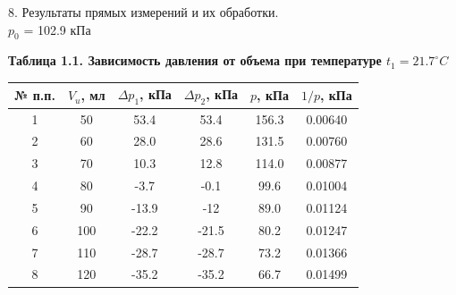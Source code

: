 \documentclass[12pt]{article}
\begin{document}
\begin{flushleft}
    8. Результаты прямых измерений и их обработки. \\
    $p_0$ = 102.9 кПа \\
    \newpage

    \begin{center}
        \textbf{Таблица 1.1. Зависимость давления от объема при температуре $ t_1 = 21.7^\circ C $} \\
    \end{center}
    \begin{table}[h]
        \centering
        \begin{tabular}{|c|c|c|c|c|c|}
            \hline
            № п.п. & $ V_u $, мл & $ \Delta p_1 $, кПа & $ \Delta p_2 $, кПа & $ p $, кПа & $ 1/p $, кПа \\
            \hline
            1  & 50  & 53.4  & 53.4  & 156.3 & 0.00640 \\
            \hline
            2  & 60  & 28.0  & 28.6  & 131.5 & 0.00760 \\
            \hline
            3  & 70  & 10.3  & 12.8  & 114.0 & 0.00877 \\
            \hline
            4  & 80  & -3.7  & -0.1  & 99.6  & 0.01004 \\
            \hline
            5  & 90  & -13.9 & -12   & 89.0  & 0.01124 \\
            \hline
            6  & 100 & -22.2 & -21.5 & 80.2  & 0.01247 \\
            \hline
            7  & 110 & -28.7 & -28.7 & 73.2  & 0.01366 \\
            \hline
            8  & 120 & -35.2 & -35.2 & 66.7  & 0.01499 \\
            \hline
        \end{tabular}    
    \end{table} 
    

\end{flushleft}
\end{document}
